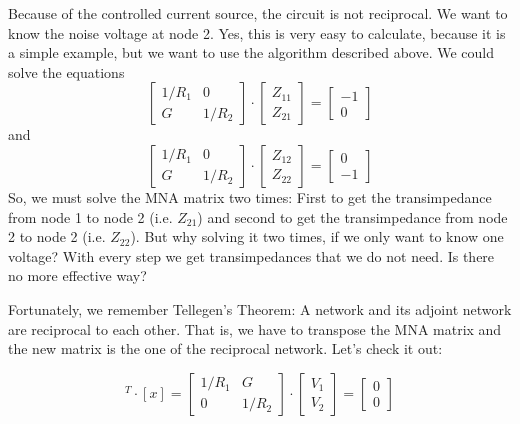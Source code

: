 Because of the controlled current source, the circuit is not
reciprocal.  We want to know the noise voltage at node 2.  Yes, this
is very easy to calculate, because it is a simple example, but we want
to use the algorithm described above.  We could solve the equations
\begin{equation}
\begin{bmatrix}
1/R_1 & 0\\
  G   & 1/R_2
\end{bmatrix}
\cdot
\begin{bmatrix}
Z_{11}\\
Z_{21}
\end{bmatrix}
=
\begin{bmatrix}
-1\\
0
\end{bmatrix}
\end{equation}
and
\begin{equation}
\begin{bmatrix}
1/R_1 & 0\\
  G   & 1/R_2
\end{bmatrix}
\cdot
\begin{bmatrix}
Z_{12}\\
Z_{22}
\end{bmatrix}
=
\begin{bmatrix}
0\\
-1
\end{bmatrix}
\end{equation}
So, we must solve the MNA matrix two times: First to get the
transimpedance from node 1 to node 2 (i.e. $Z_{21}$) and second to get
the transimpedance from node 2 to node 2 (i.e.  $Z_{22}$).  But why
solving it two times, if we only want to know one voltage? With every
step we get transimpedances that we do not need.  Is there no more
effective way?

\addvspace{12pt}

Fortunately, we remember Tellegen's Theorem: A network and its adjoint
network are reciprocal to each other.  That is, we have to transpose
the MNA matrix and the new matrix is the one of the reciprocal
network.  Let's check it out:

\begin{equation}
[A]^T\cdot [x] =
\begin{bmatrix}
1/R_1 & G\\
  0   & 1/R_2
\end{bmatrix}
\cdot
\begin{bmatrix}
V_1\\
V_2
\end{bmatrix}
=
\begin{bmatrix}
0\\
0
\end{bmatrix}
\end{equation}


